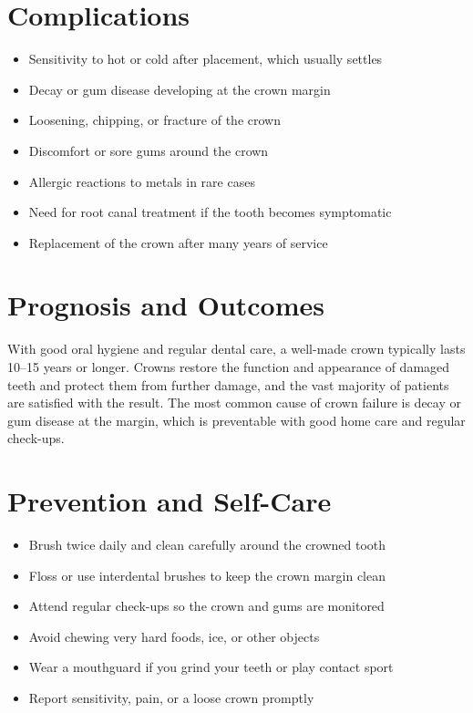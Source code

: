 \section*{Complications}
\begin{itemize}
    \item Sensitivity to hot or cold after placement, which usually settles
    \item Decay or gum disease developing at the crown margin
    \item Loosening, chipping, or fracture of the crown
    \item Discomfort or sore gums around the crown
    \item Allergic reactions to metals in rare cases
    \item Need for root canal treatment if the tooth becomes symptomatic
    \item Replacement of the crown after many years of service
\end{itemize}

\section*{Prognosis and Outcomes}
With good oral hygiene and regular dental care, a well-made crown typically lasts 10--15 years or longer. Crowns restore the function and appearance of damaged teeth and protect them from further damage, and the vast majority of patients are satisfied with the result. The most common cause of crown failure is decay or gum disease at the margin, which is preventable with good home care and regular check-ups.

\section*{Prevention and Self-Care}
\begin{itemize}
    \item Brush twice daily and clean carefully around the crowned tooth
    \item Floss or use interdental brushes to keep the crown margin clean
    \item Attend regular check-ups so the crown and gums are monitored
    \item Avoid chewing very hard foods, ice, or other objects
    \item Wear a mouthguard if you grind your teeth or play contact sport
    \item Report sensitivity, pain, or a loose crown promptly
\end{itemize}

